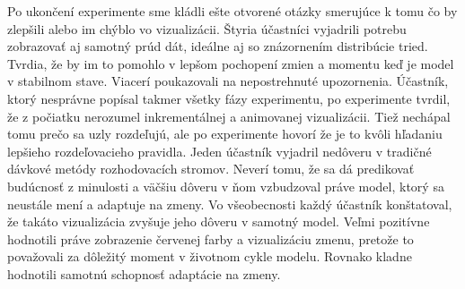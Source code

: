 Po ukončení experimente sme kládli ešte otvorené otázky smerujúce k tomu čo by zlepšili alebo im chýblo vo vizualizácii. Štyria účastníci vyjadrili potrebu zobrazovať aj samotný prúd dát, ideálne aj so znázornením distribúcie tried. Tvrdia, že by im to pomohlo v lepšom pochopení zmien a momentu keď je model v stabilnom stave. Viacerí poukazovali na nepostrehnuté upozornenia. Účastník, ktorý nesprávne popísal takmer všetky fázy experimentu, po experimente tvrdil, že z počiatku nerozumel inkrementálnej a animovanej vizualizácii. Tiež nechápal tomu prečo sa uzly rozdeľujú, ale po experimente hovorí že je to kvôli hľadaniu lepšieho rozdeľovacieho pravidla. Jeden účastník vyjadril nedôveru v tradičné dávkové metódy rozhodovacích stromov. Neverí tomu, že sa dá predikovať budúcnosť z minulosti a väčšiu dôveru v ňom vzbudzoval práve model, ktorý sa neustále mení a adaptuje na zmeny. Vo všeobecnosti každý účastník konštatoval, že takáto vizualizácia zvyšuje jeho dôveru v samotný model. Veľmi pozitívne hodnotili práve zobrazenie červenej farby a vizualizáciu zmenu, pretože to považovali za dôležitý moment v životnom cykle modelu. Rovnako kladne hodnotili samotnú schopnosť adaptácie na zmeny.




























